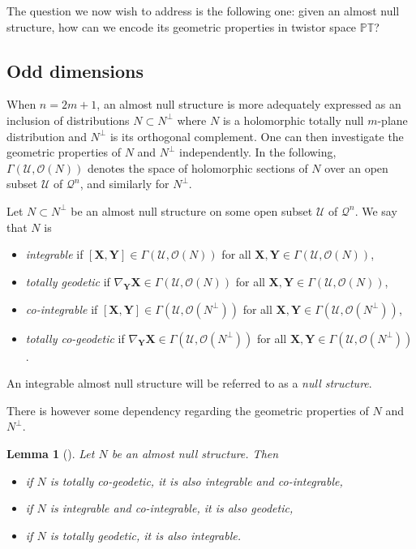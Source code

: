 \documentclass[pdftex]{sigma}
\numberwithin{equation}{section}
\newtheorem{Lemma}[Theorem]{Lemma}
\newcommand{\mc} [1]{\mathcal{#1}}
\newcommand{\PT} {\mathbb{PT}}
\begin{document}
The question we now wish to address is the following one: given an almost null structure, how can we encode its geometric properties in twistor space $\PT$?

\subsection{Odd dimensions}
When $n=2m+1$, an almost null structure is more adequately expressed as an inclusion of distributions $N \subset N^\perp$ where $N$ is a holomorphic totally null $m$-plane distribution and $N^\perp$ is its orthogonal complement. One can then investigate the geometric properties of $N$ and $N^\perp$ independently. In the following, $\Gamma (\mc{U}, \mc{O}(N))$ denotes the space of holomorphic sections of $N$ over an open subset $\mc{U}$ of $\mc{Q}^n$, and similarly for $N^\perp$.

\begin{Definition}\label{defn-int-co-geo}
Let $N \subset N^\perp$ be an almost null structure on some open subset $\mc{U}$ of $\mc{Q}^n$. We say that $N$ is
\begin{itemize}\itemsep=0pt
\item \emph{integrable} if $[\bm{X},\bm{Y}] \in \Gamma (\mc{U}, \mc{O}(N))$ for all $\bm{X}, \bm{Y} \in \Gamma (\mc{U}, \mc{O}(N))$,
\item \emph{totally geodetic} if $\nabla_{\bm{Y}} \bm{X} \in \Gamma (\mc{U}, \mc{O}(N))$ for all $\bm{X}, \bm{Y} \in \Gamma (\mc{U}, \mc{O}(N))$,
\item \emph{co-integrable} if $[\bm{X},\bm{Y}] \in \Gamma (\mc{U}, \mc{O}(N^\perp))$ for all $\bm{X}, \bm{Y} \in \Gamma (\mc{U}, \mc{O}(N^\perp))$,
\item \emph{totally co-geodetic} if $\nabla_{\bm{Y}} \bm{X} \in \Gamma (\mc{U}, \mc{O}(N^\perp))$ for all $\bm{X}, \bm{Y} \in \Gamma (\mc{U}, \mc{O}(N^\perp))$.
\end{itemize}
An integrable almost null structure will be referred to as a \emph{null structure}.
\end{Definition}

There is however some dependency regarding the geometric properties of $N$ and $N^\perp$.
\begin{Lemma}[\cite{Taghavi-Chabert2013}]\label{lem-co-geod-int-rel}
Let $N$ be an almost null structure. Then
\begin{itemize}\itemsep=0pt
\item if $N$ is totally co-geodetic, it is also integrable and co-integrable,
\item if $N$ is integrable and co-integrable, it is also geodetic,
\item if $N$ is totally geodetic, it is also integrable.
\end{itemize}
\end{Lemma}
\end{document}
